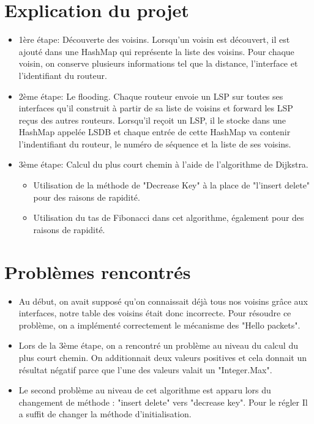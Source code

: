 \documentclass[a4paper, 12pt]{article}
\begin{document}
\section{Explication du projet}
\begin{itemize}
\item 1ère étape: Découverte des voisins.
Lorsqu'un voisin est découvert, il est ajouté dans une HashMap qui représente la liste des voisins. Pour chaque voisin, on conserve plusieurs informations tel que la distance, l'interface et l'identifiant du routeur.

\item 2ème étape: Le flooding.
Chaque routeur envoie un LSP sur toutes ses interfaces qu'il construit à partir de sa liste de voisins et forward les LSP reçus des autres routeurs.
Lorsqu'il reçoit un LSP, il le stocke dans une HashMap appelée LSDB et chaque entrée de cette HashMap va contenir l'indentifiant du routeur, le numéro de séquence et la liste de ses voisins.

\item 3ème étape: Calcul du plus court chemin à l'aide de l'algorithme de Dijkstra.
\begin{itemize}
\item Utilisation de la méthode de "Decrease Key" à la place de "l'insert delete" pour des raisons de rapidité. 
\item Utilisation du tas de Fibonacci dans cet algorithme, également pour des raisons de rapidité.
\end{itemize}
\end{itemize}
\newpage
\section{Problèmes rencontrés}
\begin{itemize}
\item
Au début, on avait supposé qu'on connaissait déjà tous nos voisins grâce aux interfaces, notre table des voisins était donc incorrecte. 
Pour résoudre ce problème, on a implémenté correctement le mécanisme des "Hello packets".
\item
Lors de la 3ème étape, on a rencontré un problème au niveau du calcul du plus court chemin. On additionnait deux valeurs positives et cela donnait un résultat négatif parce que l'une des valeurs valait un "Integer.Max".
\item
Le second problème au niveau de cet algorithme est apparu lors du changement de méthode : "insert delete" vers "decrease key". Pour le régler Il a suffit de changer la méthode d'initialisation.
\end{itemize}
\end{document}
